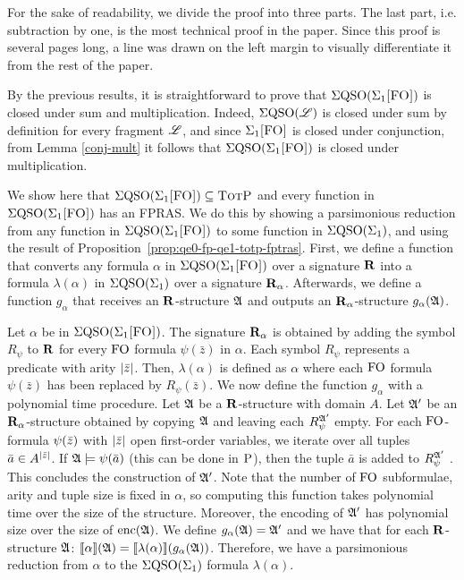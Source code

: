 
For the sake of readability, we divide the proof into three parts. The last part, i.e. subtraction by one, is the most technical proof in the paper. Since this proof is several pages long, a line was drawn on the left margin to visually differentiate it from the rest of the paper.
\medskip

 By the previous results, it is straightforward to prove that $\Sigma{\rm QSO}(\Sigma_{1}\textsc{[FO]})$ is closed under sum and multiplication. Indeed, $\Sigma{\rm QSO}(\mathscr{L})$ is closed under sum by definition for every fragment $\mathscr{L}$, and since $\Sigma_{1}\textsc{[FO]}$ is closed under conjunction, from Lemma \ref{conj-mult} it follows that $\Sigma{\rm QSO}(\Sigma_{1}\textsc{[FO]})$ is closed under multiplication.
\medskip

  We show here that $\Sigma{\rm QSO}(\Sigma_{1}\textsc{[FO]}) \subseteq \text{\sc TotP}$ and every function in $\Sigma{\rm QSO}(\Sigma_{1}\textsc{[FO]})$ has an FPRAS. We do this by showing a parsimonious reduction from any function in $\Sigma{\rm QSO}(\Sigma_{1}\textsc{[FO]})$ to some function in $\Sigma{\rm QSO}(\Sigma_{1})$, and using the result of Proposition~\ref{prop:qe0-fp-qe1-totp-fptras}. First, we define a function that converts any formula $\alpha$ in $\Sigma{\rm QSO}(\Sigma_{1}\textsc{[FO]})$ over a signature $\mathbf{R}$ into a formula $\lambda(\alpha)$ in $\Sigma{\rm QSO}(\Sigma_{1})$ over a signature $\mathbf{R}_{\alpha}$. Afterwards, we define a function $g_{\alpha}$ that receives an $\mathbf{R}$-structure $\mathfrak{A}$ and outputs an $\mathbf{R}_{\alpha}$-structure $g_{\alpha}(\mathfrak{A})$.

Let $\alpha$ be in $\Sigma{\rm QSO}(\Sigma_{1}\textsc{[FO]})$. The signature $\mathbf{R}_{\alpha}$ is obtained by adding the symbol $R_{\psi}$ to $\mathbf{R}$ for every ${\rm FO}$ formula $\psi(\bar{z})$ in $\alpha$. Each symbol $R_{\psi}$ represents a predicate with arity $\vert \bar{z} \vert$. Then, $\lambda(\alpha)$ is defined as $\alpha$ where each ${\rm FO}$ formula $\psi(\bar{z})$ has been replaced by $R_{\psi}(\bar{z})$. We now define the function $g_{\alpha}$ with a polynomial time procedure. Let $\mathfrak{A}$ be a $\mathbf{R}$-structure with domain $A$. Let $\mathfrak{A}'$ be an $\mathbf{R}_{\alpha}$-structure obtained by copying $\mathfrak{A}$ and leaving each $R_{\psi}^{\mathfrak{A}'}$ empty. For each ${\rm FO}$-formula $\psi(\bar{z})$ with $\vert \bar{z} \vert$ open first-order variables, we iterate over all tuples $\bar{a} \in A^{\vert \bar{z} \vert}$. If $\mathfrak{A}\models\psi(\bar{a})$ (this can be done in $\text{\sc P}$), then the tuple $\bar{a}$ is added to $R_{\psi}^{\mathfrak{A}'}$ . This concludes the construction of $\mathfrak{A}'$. Note that the number of ${\rm FO}$ subformulae, arity and tuple size is fixed in $\alpha$, so computing this function takes polynomial time over the size of the structure. Moreover, the encoding of $\mathfrak{A}'$ has polynomial size over the size of ${\rm enc}(\mathfrak{A})$. We define $g_{\alpha}(\mathfrak{A}) = \mathfrak{A}'$ and we have that for each $\mathbf{R}$-structure $\mathfrak{A}$: ${\llbracket{}{\alpha}\rrbracket}(\mathfrak{A}) = {\llbracket{}{\lambda(\alpha)}\rrbracket}(g_{\alpha}(\mathfrak{A}))$. Therefore, we have a parsimonious reduction from $\alpha$ to the $\Sigma{\rm QSO}(\Sigma_{1})$ formula $\lambda(\alpha)$.

